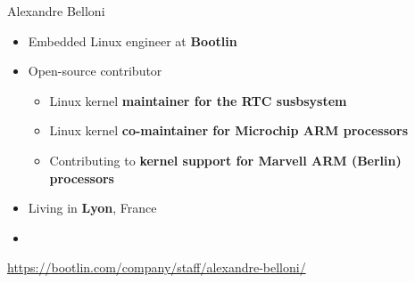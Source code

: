 \begin{frame}{Alexandre Belloni}
    \begin{itemize}
      \item Embedded Linux engineer at {\bf Bootlin}
      \item Open-source contributor
        \begin{itemize}
          \item Linux kernel {\bf maintainer for the RTC susbsystem}
          \item Linux kernel {\bf co-maintainer for Microchip ARM
            processors}
          \item Contributing to {\bf kernel support for Marvell
            ARM (Berlin) processors}
        \end{itemize}
      \item Living in {\bf Lyon}, France
      \item {}
    \end{itemize}
    {\small \url{https://bootlin.com/company/staff/alexandre-belloni/}}
\end{frame}

